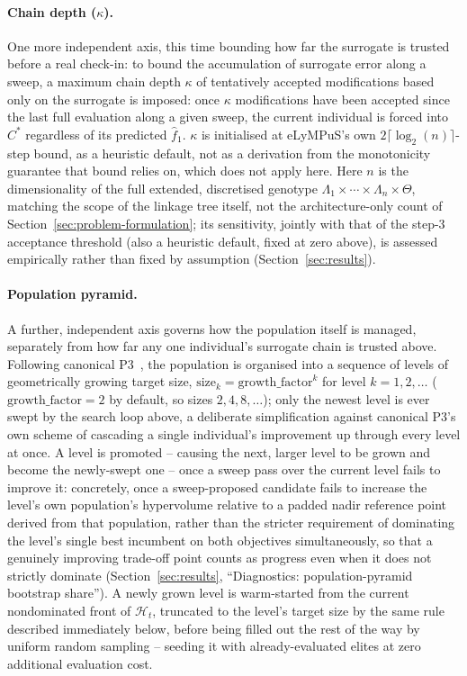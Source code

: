 \paragraph{Chain depth ($\kappa$).} One more independent axis, this time bounding how far the surrogate is trusted before a real check-in: to bound the accumulation of surrogate error along a sweep, a maximum chain depth $\kappa$ of tentatively accepted modifications based only on the surrogate is imposed: once $\kappa$ modifications have been accepted since the last full evaluation along a given sweep, the current individual is forced into $C^*$ regardless of its predicted $\hat{f}_1$. $\kappa$ is initialised at eLyMPuS's own $2\lceil\log_2(n)\rceil$-step bound, as a heuristic default, not as a derivation from the monotonicity guarantee that bound relies on, which does not apply here. Here $n$ is the dimensionality of the full extended, discretised genotype $\Lambda_1 \times \cdots \times \Lambda_n \times \Theta$, matching the scope of the linkage tree itself, not the architecture-only count of Section~\ref{sec:problem-formulation}; its sensitivity, jointly with that of the step-3 acceptance threshold (also a heuristic default, fixed at zero above), is assessed empirically rather than fixed by assumption (Section~\ref{sec:results}).

\paragraph{Population pyramid.} A further, independent axis governs how the population itself is managed, separately from how far any one individual's surrogate chain is trusted above. Following canonical P3~\citep{goldman2014parameterless}, the population is organised into a sequence of levels of geometrically growing target size, $\text{size}_k = \text{growth\_factor}^k$ for level $k=1,2,\dots$ ($\text{growth\_factor}=2$ by default, so sizes $2,4,8,\dots$); only the newest level is ever swept by the search loop above, a deliberate simplification against canonical P3's own scheme of cascading a single individual's improvement up through every level at once. A level is promoted -- causing the next, larger level to be grown and become the newly-swept one -- once a sweep pass over the current level fails to improve it: concretely, once a sweep-proposed candidate fails to increase the level's own population's hypervolume relative to a padded nadir reference point derived from that population, rather than the stricter requirement of dominating the level's single best incumbent on both objectives simultaneously, so that a genuinely improving trade-off point counts as progress even when it does not strictly dominate (Section~\ref{sec:results}, ``Diagnostics: population-pyramid bootstrap share''). A newly grown level is warm-started from the current nondominated front of $\mathcal{H}_t$, truncated to the level's target size by the same rule described immediately below, before being filled out the rest of the way by uniform random sampling -- seeding it with already-evaluated elites at zero additional evaluation cost.

